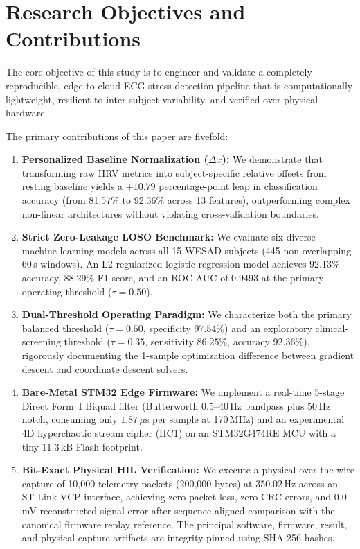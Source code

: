 \documentclass[conference]{IEEEtran}
\begin{document}
\section{Research Objectives and Contributions}
\label{sec:objectives}

The core objective of this study is to engineer and validate a completely reproducible, edge-to-cloud ECG stress-detection pipeline that is computationally lightweight, resilient to inter-subject variability, and verified over physical hardware. 

The primary contributions of this paper are fivefold:
\begin{enumerate}
    \item \textbf{Personalized Baseline Normalization ($\Delta x$):} We demonstrate that transforming raw HRV metrics into subject-specific relative offsets from resting baseline yields a $+10.79$ percentage-point leap in classification accuracy (from 81.57\% to 92.36\% across 13 features), outperforming complex non-linear architectures without violating cross-validation boundaries.
    \item \textbf{Strict Zero-Leakage LOSO Benchmark:} We evaluate six diverse machine-learning models across all 15 WESAD subjects (445 non-overlapping 60\,s windows). An L2-regularized logistic regression model achieves 92.13\% accuracy, 88.29\% F1-score, and an ROC-AUC of 0.9493 at the primary operating threshold ($\tau = 0.50$).
    \item \textbf{Dual-Threshold Operating Paradigm:} We characterize both the primary balanced threshold ($\tau = 0.50$, specificity $97.54\%$) and an exploratory clinical-screening threshold ($\tau = 0.35$, sensitivity $86.25\%$, accuracy $92.36\%$), rigorously documenting the 1-sample optimization difference between gradient descent and coordinate descent solvers.
    \item \textbf{Bare-Metal STM32 Edge Firmware:} We implement a real-time 5-stage Direct Form~I Biquad filter (Butterworth 0.5--40\,Hz bandpass plus 50\,Hz notch, consuming only $1.87\,\mu\text{s}$ per sample at 170\,MHz) and an experimental 4D hyperchaotic stream cipher (HC1) on an STM32G474RE MCU with a tiny 11.3\,kB Flash footprint.
    \item \textbf{Bit-Exact Physical HIL Verification:} We execute a physical over-the-wire capture of 10,000 telemetry packets (200,000 bytes) at 350.02\,Hz across an ST-Link VCP interface, achieving zero packet loss, zero CRC errors, and 0.0\,mV reconstructed signal error after sequence-aligned comparison with the canonical firmware replay reference. The principal software, firmware, result, and physical-capture artifacts are integrity-pinned using SHA-256 hashes.
\end{enumerate}
\end{document}
